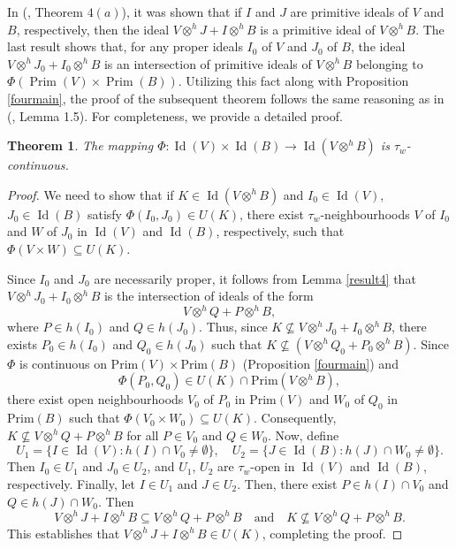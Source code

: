 \documentclass{birkjour}
\newtheorem{thm}{Theorem}[section]
\theoremstyle{definition}
\theoremstyle{remark}
\numberwithin{equation}{section}
\begin{document}
In (\cite{AA}, Theorem $4(a)$),  it was shown that if $I$ and $J$ are primitive ideals of $V$ and $B$, respectively, then the ideal \( V \otimes^{h} J + I \otimes^{h} B \) is a primitive ideal of \( V \otimes^{h} B \). The last result shows that, for any proper ideals \( I_0 \) of \( V \) and \( J_0 \) of \( B \), the ideal \( V \otimes^{h} J_0 + I_0 \otimes^{h} B \) is an intersection of  primitive ideals of \( V \otimes^{h} B \) belonging to $\Phi(\operatorname{Prim}(V) \times \operatorname{Prim}(B))$.
Utilizing this fact along with Proposition \ref{fourmain}, the proof of the subsequent theorem follows the same reasoning as in (\cite{Kanimin}, Lemma 1.5). For completeness, we provide a detailed proof.

\begin{thm} \label{mainthm1} The mapping $\Phi: \operatorname{Id}(V) \times \operatorname{Id}(B) \to \operatorname{Id}(V \otimes^h B)$ is $\tau_w$-continuous.
\end{thm}

\begin{proof}
      We need  to show that if $K \in \operatorname{Id}(V \otimes^h B)$ and $I_0 \in \operatorname{Id}(V)$, $J_0 \in \operatorname{Id}(B)$ satisfy $\Phi(I_0, J_0) \in U(K)$,  there exist $\tau_w$-neighbourhoods $V$ of $I_0$ and $W$ of $J_0$ in $\operatorname{Id}(V)$ and $\operatorname{Id}(B)$, respectively, such that $\Phi(V \times W) \subseteq U(K)$. 

 Since $I_0$ and $J_0$ are necessarily proper, it follows from  Lemma \ref{result4} that $V\otimes^h J_0 + I_0 \otimes^h B$ is the intersection of ideals of the form
\[
V \otimes^h Q + P \otimes^h B,
\]
where $P \in h(I_0)$ and $Q \in h(J_0)$. Thus, since $K \nsubseteq V \otimes^h J_0+ I_0 \otimes^h B$,  there exists $P_0 \in h(I_0)$ and $Q_0 \in h(J_0)$ such that
 $K \nsubseteq (V \otimes^h Q_0 + P_0 \otimes^h B)$.
Since $\Phi$ is continuous on $\text{Prim}(V) \times \text{Prim}(B)$ (Proposition \ref{fourmain}) and
\[
\Phi(P_0, Q_0) \in U(K) \cap \text{Prim}(V \otimes^h B),
\]
there exist open neighbourhoods $V_0$ of $P_0$ in $\text{Prim}(V)$ and $W_0$ of $Q_0$ in $\text{Prim}(B)$ such that $\Phi(V_0 \times W_0) \subseteq U(K)$. Consequently, $K \nsubseteq V \otimes^h Q + P \otimes^h B$ for all $P \in V_0$ and $Q \in W_0$. Now, define
\[
U_1 = \{I \in \operatorname{Id}(V): h(I) \cap V_0 \neq \emptyset\}, \quad U_2 = \{J \in \operatorname{Id}(B): h(J) \cap W_0 \neq \emptyset\}.
\]
Then $I_0 \in U_1$ and $J_0 \in U_2$, and $U_1$,  $U_2$ are $\tau_w$-open in $\operatorname{Id}(V)$ and  $\operatorname{Id}(B)$, respectively. Finally, let $I \in U_1$ and $J \in U_2$. Then, there exist $P \in h(I) \cap V_0$ and $Q \in h(J) \cap W_0$. Then
\[
V \otimes^h J + I \otimes^h B \subseteq V \otimes^h Q + P \otimes^h B \quad \text{and} \quad  K \nsubseteq V \otimes^h Q + P \otimes^h B.
\]
This establishes that $V \otimes^h J + I \otimes^h B \in U(K)$, completing the proof. 
\end{proof}
\end{document}
